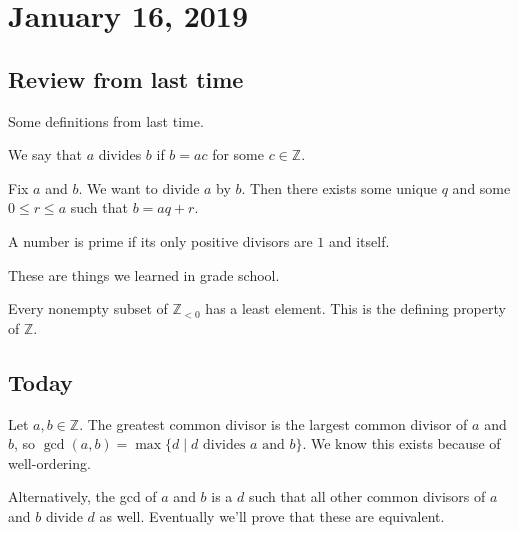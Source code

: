 
\section{January 16, 2019}

\subsection{Review from last time}
Some definitions from last time.

\begin{definition}[Divisibility]
We say that $a$ divides $b$ if $b = ac$ for some $c \in \mathbb{Z}$.
\end{definition}

\begin{definition}
Fix $a$ and $b$. We want to divide $a$ by $b$. Then there exists some unique $q$ and some $0 \leq r \leq a$ such that $b = aq + r$.
\end{definition}

\begin{definition}[Prime]
A number is prime if its only positive divisors are $1$ and itself.
\end{definition}

These are things we learned in grade school.

\begin{theorem}
Every nonempty subset of $\mathbb{Z}_{<0}$ has a least element. This is the defining property of $\mathbb{Z}$.
\end{theorem}

\subsection{Today}

\begin{definition}[GCD]
Let $a,b \in \mathbb{Z}$. The greatest common divisor is the largest common divisor of $a$ and $b$, so $\gcd(a,b) = \max\{d \mid \text{$d$ divides $a$ and $b$}\}$. We know this exists because of well-ordering.
\end{definition}

\begin{definition}[GCD]
Alternatively, the gcd of $a$ and $b$ is a $d$ such that all other common divisors of $a$ and $b$ divide $d$ as well. Eventually we'll prove that these are equivalent.
\end{definition}

